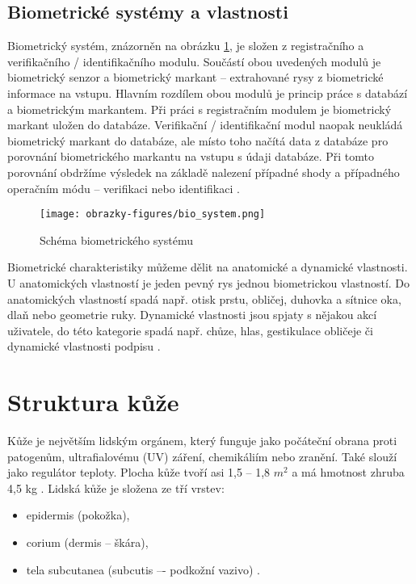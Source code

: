 \subsection{Biometrické systémy a vlastnosti}
Biometrický systém, znázorněn na obrázku \ref{fig:biosystem}, je složen z registračního a verifikačního / identifikačního modulu. Součástí obou uvedených modulů je biometrický senzor a biometrický markant -- extrahované rysy z biometrické informace na vstupu. Hlavním rozdílem obou modulů je princip práce s databází a biometrickým markantem.  Při práci s registračním modulem je biometrický markant uložen do databáze. Verifikační / identifikační modul naopak neukládá biometrický markant do databáze, ale místo toho načítá data z databáze pro porovnání biometrického markantu na vstupu s údaji databáze. Při tomto porovnání obdržíme výsledek na základě nalezení případné shody a případného operačním módu -- verifikaci nebo identifikaci \cite{BIOopora}.

\begin{figure}[!htbp]
    \centering
    \texttt{[image: obrazky-figures/bio\_system.png]}
    \caption{Schéma biometrického systému \cite{BIOopora}}
    \label{fig:biosystem}
\end{figure}

Biometrické charakteristiky můžeme dělit na anatomické a dynamické vlastnosti. U anatomických vlastností je jeden pevný rys jednou biometrickou vlastností. Do anatomických vlastností spadá např. otisk prstu, obličej, duhovka a sítnice oka, dlaň nebo geometrie ruky. Dynamické vlastnosti jsou spjaty s nějakou akcí uživatele, do této kategorie spadá např. chůze, hlas, gestikulace obličeje či dynamické vlastnosti podpisu \cite{BIOopora}. 
\section{Struktura kůže}
Kůže je největším lidským orgánem, který funguje jako počáteční obrana proti patogenům, ultrafialovému (UV) záření, chemikáliím nebo zranění. Také slouží jako regulátor teploty. Plocha kůže tvoří asi 1,5 -- 1,8 $m^2$ a má hmotnost zhruba 4,5 kg \cite{ZakladyFunkcniAnatomieCloveka}. 
Lidská kůže je složena ze tří vrstev:
\begin{itemize}
    \item epidermis (pokožka),
    \item corium (dermis -- škára),
    \item tela subcutanea (subcutis –- podkožní vazivo)  \cite{ZakladyFunkcniAnatomieCloveka}.
\end{itemize}

